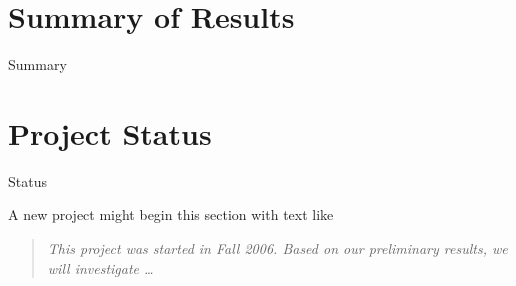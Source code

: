 \documentclass[conference, 11pt]{IEEEtran}
\begin{document}
\section{Summary of Results}
Summary
\section{Project Status}
Status

A new project might begin this section with  text like
\begin{quotation}
\em This project was started in Fall 2006. Based on our preliminary
results, we will investigate \ldots
\end{quotation} 


%
\end{document}
